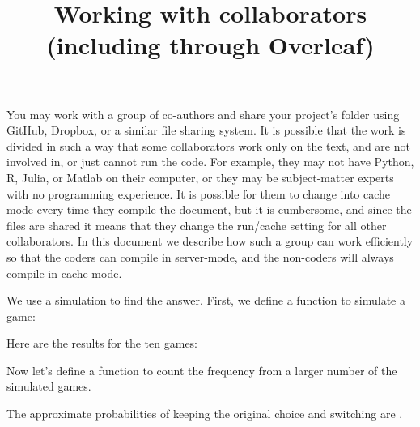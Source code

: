 \documentclass[12pt]{article}
\begin{document}
\title{Working with collaborators (including through Overleaf)}
\maketitle

You may work with a group of co-authors and share your project's folder using GitHub, Dropbox, or a similar file sharing system.
It is possible that the work is divided in such a way that some collaborators work only on the text, and are not involved in, or just cannot run the code. For example, they may not have Python, R, Julia, or Matlab on their computer, or they may be subject-matter experts with no programming experience.
It is possible for them to change into cache mode every time they compile the document, but it is cumbersome, and since the files are shared it means that they change the run/cache setting for all other collaborators. In this document we describe how such a group can work efficiently so that the coders can compile in server-mode, and the non-coders will always compile in cache mode.


We use a simulation to find the answer. First, we define a function to simulate
a game:


Here are the results for the ten games:

Now let's define a function to count the frequency from a larger number of the
simulated games.


The approximate probabilities of keeping the original choice and switching are .
\end{document}
